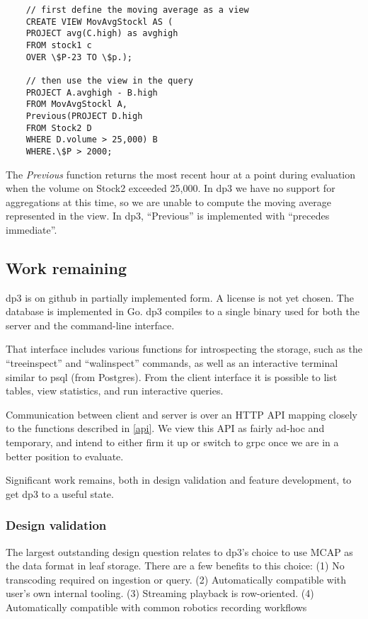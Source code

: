 \documentclass[9pt,twocolumn]{article}
\newcommand{\q}[1]{``#1''}
\begin{document}
    \begin{lstlisting}
    // first define the moving average as a view
    CREATE VIEW MovAvgStockl AS (
    PROJECT avg(C.high) as avghigh
    FROM stock1 c
    OVER \$P-23 TO \$p.);

    // then use the view in the query
    PROJECT A.avghigh - B.high
    FROM MovAvgStockl A,
    Previous(PROJECT D.high
    FROM Stock2 D
    WHERE D.volume > 25,000) B
    WHERE.\$P > 2000;
    \end{lstlisting}

    The \textit{Previous} function returns the most recent hour at a point during
    evaluation when the volume on Stock2 exceeded 25,000. In dp3 we have no support
    for aggregations at this time, so we are unable to compute the moving average
    represented in the view. In dp3, \q{Previous} is implemented with \q{precedes
    immediate}.

    \subsection{Work remaining}
    dp3 is on github \cite{dp3} in partially implemented form. A license is not
    yet chosen. The database is implemented in Go. dp3 compiles to a single
    binary used for both the server and the command-line interface.

    That interface includes various functions for introspecting the storage,
    such as the \q{treeinspect} and \q{walinspect} commands, as well as an
    interactive terminal similar to psql (from Postgres). From the client
    interface it is possible to list tables, view statistics, and run
    interactive queries.

    Communication between client and server is over an HTTP API mapping closely
    to the functions described in \ref{api}. We view this API as fairly ad-hoc
    and temporary, and intend to either firm it up or switch to grpc once we
    are in a better position to evaluate.

    Significant work remains, both in design validation and feature
    development, to get dp3 to a useful state.


    \subsubsection{Design validation}
    The largest outstanding design question relates to dp3’s choice to use MCAP
    as the data format in leaf storage. There are a few benefits to this
    choice: (1) No transcoding required on ingestion or query. (2)
    Automatically compatible with user’s own internal tooling. (3) Streaming
    playback is row-oriented. (4) Automatically compatible with common robotics
    recording workflows
\end{document}
